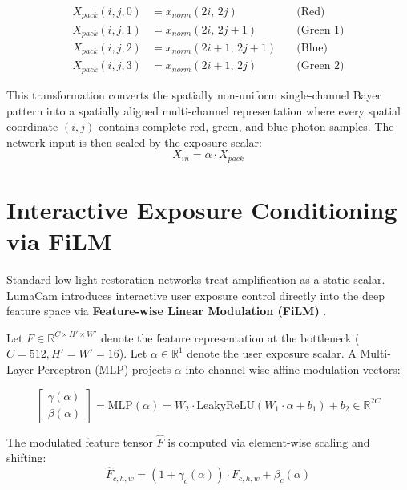 \begin{equation}
\begin{aligned}
X_{pack}(i, j, 0) &= x_{norm}(2i, \, 2j) \quad &\text{(Red)} \\
X_{pack}(i, j, 1) &= x_{norm}(2i, \, 2j+1) \quad &\text{(Green 1)} \\
X_{pack}(i, j, 2) &= x_{norm}(2i+1, \, 2j+1) \quad &\text{(Blue)} \\
X_{pack}(i, j, 3) &= x_{norm}(2i+1, \, 2j) \quad &\text{(Green 2)}
\end{aligned}
\label{eq:bayer_packing}
\end{equation}

This transformation converts the spatially non-uniform single-channel Bayer pattern into a spatially aligned multi-channel representation where every spatial coordinate $(i, j)$ contains complete red, green, and blue photon samples. The network input is then scaled by the exposure scalar:
\begin{equation}
X_{in} = \alpha \cdot X_{pack}
\label{eq:amplified_input}
\end{equation}

\section{Interactive Exposure Conditioning via FiLM}
Standard low-light restoration networks treat amplification as a static scalar. LumaCam introduces interactive user exposure control directly into the deep feature space via \textbf{Feature-wise Linear Modulation (FiLM)} \cite{perez2018film}.

Let $F \in \mathbb{R}^{C \times H' \times W'}$ denote the feature representation at the bottleneck ($C = 512, H' = W' = 16$). Let $\alpha \in \mathbb{R}^1$ denote the user exposure scalar. A Multi-Layer Perceptron (MLP) projects $\alpha$ into channel-wise affine modulation vectors:

\begin{equation}
\begin{bmatrix} \gamma(\alpha) \\ \beta(\alpha) \end{bmatrix} = \text{MLP}(\alpha) = W_2 \cdot \text{LeakyReLU}(W_1 \cdot \alpha + b_1) + b_2 \in \mathbb{R}^{2C}
\label{eq:film_mlp}
\end{equation}

The modulated feature tensor $\hat{F}$ is computed via element-wise scaling and shifting:
\begin{equation}
\hat{F}_{c, h, w} = \left(1 + \gamma_c(\alpha)\right) \cdot F_{c, h, w} + \beta_c(\alpha)
\label{eq:film_affine}
\end{equation}

